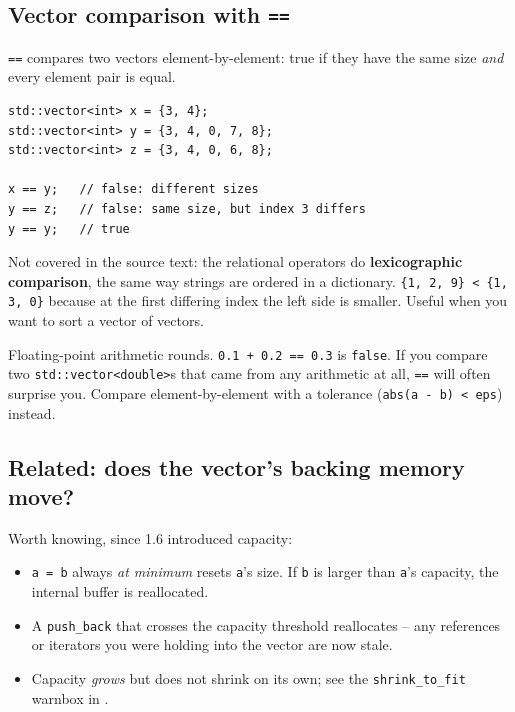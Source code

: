 \documentclass[11pt]{article}
\begin{document}
\subsection{Vector comparison with \texttt{==}}

\texttt{==} compares two vectors element-by-element: true if they
have the same size \emph{and} every element pair is equal.

\begin{lstlisting}
std::vector<int> x = {3, 4};
std::vector<int> y = {3, 4, 0, 7, 8};
std::vector<int> z = {3, 4, 0, 6, 8};

x == y;   // false: different sizes
y == z;   // false: same size, but index 3 differs
y == y;   // true
\end{lstlisting}

\begin{notebox}[\texttt{<}, \texttt{>}, \texttt{<=}, \texttt{>=} also work]
Not covered in the source text: the relational operators do
\textbf{lexicographic comparison}, the same way strings are ordered
in a dictionary. \texttt{\{1, 2, 9\} < \{1, 3, 0\}} because at the
first differing index the left side is smaller. Useful when you want
to sort a vector of vectors.
\end{notebox}

\begin{warnbox}[Never \texttt{==} floating-point vectors by accident]
Floating-point arithmetic rounds. \texttt{0.1 + 0.2 == 0.3} is
\texttt{false}. If you compare two \texttt{std::vector<double>}s that
came from any arithmetic at all, \texttt{==} will often surprise you.
Compare element-by-element with a tolerance (\texttt{abs(a - b) <
eps}) instead.
\end{warnbox}

\subsection{Related: does the vector's backing memory move?}

Worth knowing, since 1.6 introduced capacity:

\begin{itemize}
    \item \texttt{a = b} always \emph{at minimum} resets \texttt{a}'s
          size. If \texttt{b} is larger than \texttt{a}'s capacity, the
          internal buffer is reallocated.
    \item A \texttt{push\_back} that crosses the capacity threshold
          reallocates -- any references or iterators you were holding
          into the vector are now stale.
    \item Capacity \emph{grows} but does not shrink on its own; see
          the \texttt{shrink\_to\_fit} warnbox in .
\end{itemize}
\end{document}
